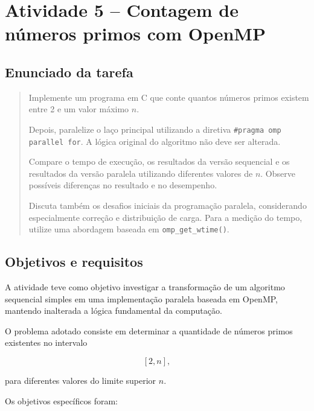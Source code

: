 \chapter{Atividade 5 -- Contagem de números primos com OpenMP}
\label{chap:atvd05}

\section{Enunciado da tarefa}
\label{sec:atvd05-enunciado}

\begin{quote}
Implemente um programa em C que conte quantos números primos existem entre 2 e um valor máximo \(n\).

Depois, paralelize o laço principal utilizando a diretiva
\texttt{\#pragma omp parallel for}. A lógica original do algoritmo não deve ser alterada.

Compare o tempo de execução, os resultados da versão sequencial e os resultados da versão paralela utilizando diferentes valores de \(n\). Observe possíveis diferenças no resultado e no desempenho.

Discuta também os desafios iniciais da programação paralela, considerando especialmente correção e distribuição de carga. Para a medição do tempo, utilize uma abordagem baseada em \texttt{omp\_get\_wtime()}.
\end{quote}


\section{Objetivos e requisitos}
\label{sec:atvd05-objetivos}

A atividade teve como objetivo investigar a transformação de um algoritmo
sequencial simples em uma implementação paralela baseada em OpenMP,
mantendo inalterada a lógica fundamental da computação.

O problema adotado consiste em determinar a quantidade de números primos
existentes no intervalo

\[
[2,n],
\]

para diferentes valores do limite superior \(n\).

Os objetivos específicos foram:

